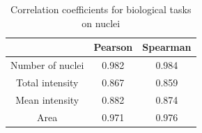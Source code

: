 \begin{table}[htb]
    \centering
    \caption{Correlation coefficients for biological tasks on nuclei}
        \begin{adjustbox}{width=0.4\textwidth}
            \begin{tabular}{|c|c|c|}\hline
                &Pearson&Spearman
                \\\hline\hline
                Number of nuclei&0.982&0.984\\\hline
                Total intensity&0.867&0.859\\\hline
                Mean intensity&0.882&0.874\\\hline
                Area&0.971&0.976\\\hline
            \end{tabular}
        \label{table:nuclei-downstream-metrics-coefficients}
        \end{adjustbox}
\end{table}
